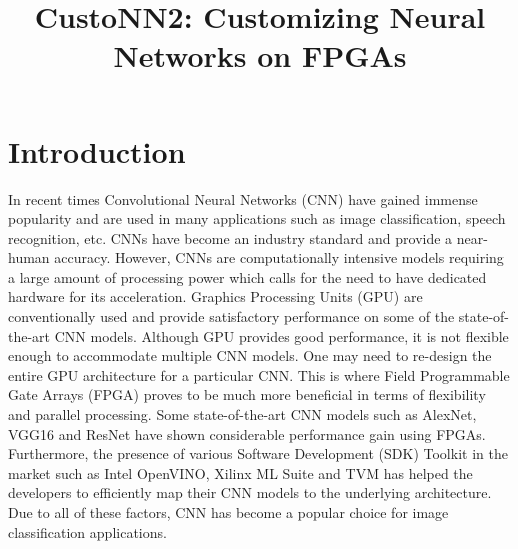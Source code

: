 \documentclass[titlepage]{report}
\title{\textbf{CustoNN2: Customizing Neural Networks on FPGAs}}
\begin{document}
\maketitle

\tableofcontents{}
\newpage

\chapter{Introduction}
In recent times Convolutional Neural Networks (CNN) have gained immense popularity and are used in many applications such as image classification, speech recognition, etc. CNNs have become an industry standard and provide a near-human accuracy. However, CNNs are computationally intensive models requiring a large amount of processing power which calls for the need to have dedicated
hardware for its acceleration. Graphics Processing Units (GPU) are conventionally used and provide satisfactory performance on some of the state-of-the-art CNN models. Although GPU provides good performance, it is not flexible enough to accommodate multiple CNN models. One may need to re-design the entire GPU architecture for a particular CNN. This is where Field Programmable
Gate Arrays (FPGA) proves to be much more beneficial in terms of flexibility
and parallel processing. Some state-of-the-art CNN models such as AlexNet,
VGG16 and ResNet have shown considerable performance gain using FPGAs.
Furthermore, the presence of various Software Development (SDK) Toolkit
in the market such as Intel OpenVINO, Xilinx ML Suite and TVM has helped
the developers to efficiently map their CNN models to the underlying architecture. Due to all of these factors, CNN has become a popular choice for image
classification applications.
\end{document}
